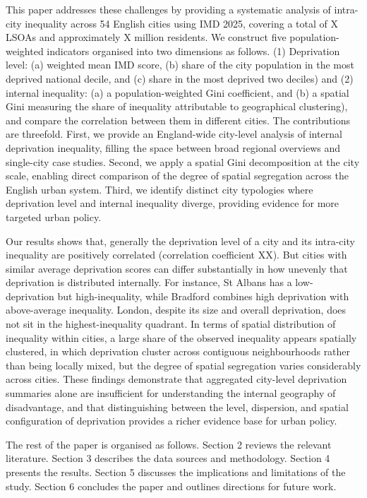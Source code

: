 \documentclass[11pt,journal,compsoc]{IEEEtran}
\begin{document}
This paper addresses these challenges by providing a systematic analysis of intra-city inequality across 54 English cities using IMD 2025, covering a total of X LSOAs and approximately X million residents. We construct five population-weighted indicators organised into two dimensions as follows. (1) Deprivation level: (a) weighted mean IMD score, (b) share of the city population in the most deprived national decile, and (c) share in the most deprived two deciles) and (2) internal inequality: (a) a population-weighted Gini coefficient, and (b) a spatial Gini measuring the share of inequality attributable to geographical clustering), and compare the correlation between them in different cities. The contributions are threefold. First, we provide an England-wide city-level analysis of internal deprivation inequality, filling the space between broad regional overviews and single-city case studies. Second, we apply a spatial Gini decomposition at the city scale, enabling direct comparison of the degree of spatial segregation across the English urban system. Third, we identify distinct city typologies where deprivation level and internal inequality diverge, providing evidence for more targeted urban policy.


Our results shows that, generally the deprivation level of a city and its intra-city inequality are positively correlated (correlation coefficient XX). But cities with similar average deprivation scores can differ substantially in how unevenly that deprivation is distributed internally. For instance, St Albans has a low-deprivation but high-inequality, while Bradford combines high deprivation with above-average inequality. London, despite its size and overall deprivation, does not sit in the highest-inequality quadrant. In terms of spatial distribution of inequality within cities, a large share of the observed inequality appears spatially clustered, in which deprivation cluster across contiguous neighbourhoods rather than being locally mixed, but the degree of spatial segregation varies considerably across cities. These findings demonstrate that aggregated city-level deprivation summaries alone are insufficient for understanding the internal geography of disadvantage, and that distinguishing between the level, dispersion, and spatial configuration of deprivation provides a richer evidence base for urban policy.


The rest of the paper is organised as follows. Section 2 reviews the relevant literature. Section 3 describes the data sources and methodology. Section 4 presents the results. Section 5 discusses the implications and limitations of the study. Section 6 concludes the paper and outlines directions for future work.
\end{document}
